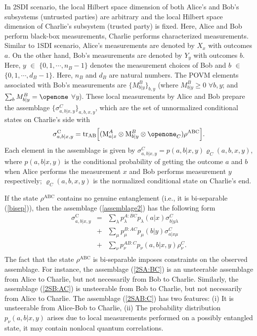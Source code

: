 \documentclass[reprint,superscriptaddress,nofootinbib,amsmath,amssymb,aps,pra,longbibliography]{revtex4-1}
\begin{document}
In 2SDI scenario, the local Hilbert space dimension of both Alice's and Bob's subsystems (untrusted parties) are arbitrary and the local Hilbert space dimension of Charlie's subsystem (trusted party) is fixed. Here, Alice and Bob perform black-box measurements, Charlie performs characterized measurements. Similar to 1SDI scenario, Alice's measurements are denoted by $X_x$ with outcomes $a$. On the other hand, Bob's measurements are denoted by  $Y_y$  with outcomes $b$. Here, $y$ $\in$ $\{0,1, \cdots, n_B-1\}$ denotes the measurement choices of Bob and $b$ $\in$ $\{0, 1, \cdots, d_B-1\}$. Here, $n_B$ and $d_B$ are natural numbers. The POVM elements associated with Bob's measurements are $\{M^B_{b|{y}}\}_{b,y}$ (where $M^B_{b|{y}} \geq 0$ $\forall b, y$; and $\sum_{b} M^B_{b|{y}} = \openone$ $\forall y$). These local measurements by Alice and Bob prepare the assemblage $\{\sigma^{C}_{a,b|x,y}\}_{a,b,x,y}$, which are the set of unnormalized conditional states on Charlie's side with 
\begin{equation}
	\sigma^{\text{C}}_{a,b|x,y} = \text{tr}_{\text{AB}} \Big[(\text{M}_{a|x}^{A} \otimes \text{M}_{b|y}^{B} \otimes \openone_C) \rho^{\text{ABC}} \Big].
	\label{assemblage2}
\end{equation}
Each element in the assemblage  is given by $\sigma^{C}_{a,b|x,y}=p(a, b|x,y)\varrho_{C}(a, b, x, y)$,  where $p(a, b|x, y)$ is the conditional probability of getting the outcome $a$ and $b$ when Alice performs the measurement $x$ and Bob performs measurement $y$ respectively; $\varrho_{C}(a, b, x, y)$ is the normalized conditional state on Charlie's end. 

If the state $\rho^{\text{ABC}}$ contains no genuine entanglement (i.e., it is bi-separable (\ref{bisep})), then the assemblage (\ref{assemblage2}) has the following form \cite{Cavalcanti15}
\begin{eqnarray} 
	\sigma^{\text{C}}_{a,b|x,y} &=& \sum_\lambda p_\lambda^{A:BC}p_\lambda(a|x)\sigma_{b|y\lambda}^{C}
		\label{2SA:BC}\\ 
						 &+& \sum_\mu p_\mu^{B:AC}p_\mu(b|y) \sigma_{a|x\mu}^{C}
						 \label{2SB:AC}\\ 
						 &+& \sum_\nu p_\nu^{AB:C} p_{\nu}(a,b|x,y) \rho_\nu^C .
						 \label{2SAB:C} \\ \nonumber
\end{eqnarray} 
The fact that the state $\rho^{\text{ABC}}$ is bi-separable imposes constraints on the  observed assemblage. For instance, the assemblage (\ref{2SA:BC}) is an unsteerable assemblage from Alice to Charlie, but not necessarily from Bob to Charlie. Similarly, the assemblage (\ref{2SB:AC}) is unsteerable from Bob to Charlie, but not necessarily from Alice to Charlie. The assemblage (\ref{2SAB:C}) has two features: (i) It is unsteerable from Alice-Bob to  Charlie,  (ii) The probability distribution $p_{\nu}(a,b|x, y)$ arises due to local measurements performed on a possibly entangled state, it may contain nonlocal quantum correlations. 
\end{document}
